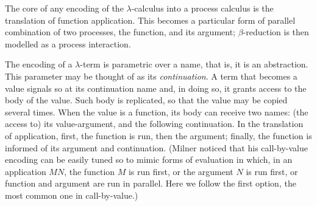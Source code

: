 The core of any encoding of the  $\lambda$-calculus into a process calculus is the 
translation of function application. This  
becomes a particular form of parallel combination of two processes, the function, and its argument;  
 $\beta$-reduction is then modelled as a process interaction. 


The encoding of a $\lambda$-term is parametric over a name, that is, it is an abstraction.
This parameter may
be thought of as %
its \emph{continuation}.  
A term that becomes a value signals so at its continuation name
and, in doing so, it grants access 
to the body of the value. 
Such body is replicated, so that the value may be
copied several times.
When the value is a function, its body can
receive two names: (the access to) its value-argument, and the
following continuation.
In the translation of application, first, the function is run, then
the argument; finally, the function is informed of its argument and 
continuation.
(Milner noticed \cite{Mil92s} that his
call-by-value encoding can be easily tuned so to mimic
forms of 
evaluation in which, in an application $MN$, the function $M$ is run
first, or the argument $N$ is run first, or function and argument are
run in parallel.  Here we follow  the first option,  the most common  one in
 call-by-value.)

